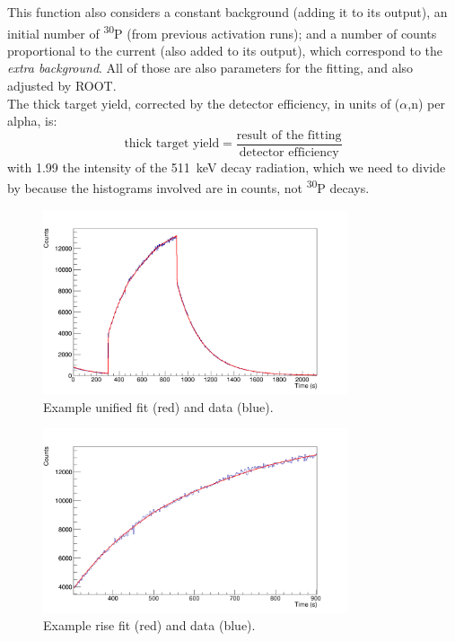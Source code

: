 \documentclass[a4paper,12pt]{report}
\newcommand{\an}{($\alpha$,n) }
\newcommand{\Piso}{\textsuperscript{30}P }
\begin{document}
This function also considers a constant background (adding it to its output), an initial number of \Piso (from previous activation runs); and a number of counts proportional to the current (also added to its output), which correspond to the \textit{extra background}.
All of those are also parameters for the fitting, and also adjusted by ROOT.
\\

The thick target yield, corrected by the detector efficiency, in units of \an per alpha, is:
\begin{equation}
	\text{thick target yield} = \frac{\text{result of the fitting}}{\text{detector efficiency}}
\end{equation}
with \num{1.99} the intensity of the \qty{511}{\keV} decay radiation, which we need to divide by because the histograms involved are in counts, not \Piso decays.

\begin{figure}[H]
	\centering
	\includegraphics[width=0.80\textwidth]{example_unified_fit.png}
	\caption{Example unified fit (red) and data (blue).}
	\label{example_unified_fit}
\end{figure}

\begin{figure}[H]
	\centering
	\includegraphics[width=0.80\textwidth]{example_rise_fit.png}
	\caption{Example rise fit (red) and data (blue).}
	\label{example_rise_fit}
\end{figure}
\end{document}
